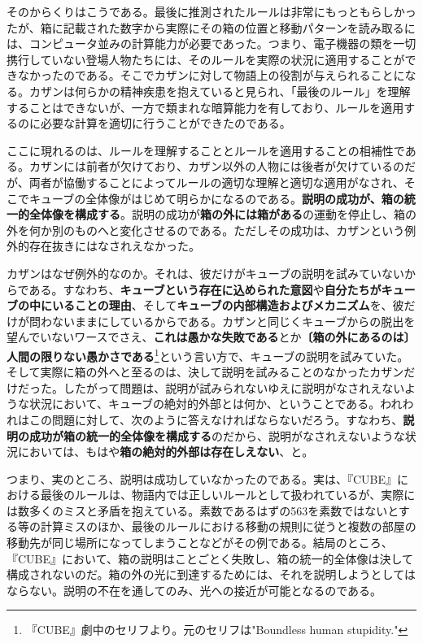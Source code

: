 \documentclass[b5j,twoside,twocolumn]{utarticle}
\begin{document}
そのからくりはこうである。最後に推測されたルールは非常にもっともらしかったが、箱に記載された数字から実際にその箱の位置と移動パターンを読み取るには、コンピュータ並みの計算能力が必要であった。つまり、電子機器の類を一切携行していない登場人物たちには、そのルールを実際の状況に適用することができなかったのである。そこでカザンに対して物語上の役割が与えられることになる。カザンは何らかの精神疾患を抱えていると見られ、「最後のルール」を理解することはできないが、一方で類まれな暗算能力を有しており、ルールを適用するのに必要な計算を適切に行うことができたのである。

ここに現れるのは、ルールを理解することとルールを適用することの相補性である。カザンには前者が欠けており、カザン以外の人物には後者が欠けているのだが、両者が協働することによってルールの適切な理解と適切な適用がなされ、そこでキューブの全体像がはじめて明らかになるのである。\textbf{説明の成功が、箱の統一的全体像を構成する}。説明の成功が\textbf{箱の外には箱がある}の運動を停止し、箱の外を何か別のものへと変化させるのである。ただしその成功は、カザンという例外的存在抜きにはなされえなかった。

カザンはなぜ例外的なのか。それは、彼だけがキューブの説明を試みていないからである。すなわち、\textbf{キューブという存在に込められた意図}や\textbf{自分たちがキューブの中にいることの理由}、そして\textbf{キューブの内部構造およびメカニズム}を、彼だけが問わないままにしているからである。カザンと同じくキューブからの脱出を望んでいないワースでさえ、\textbf{これは愚かな失敗である}とか\textbf{〔箱の外にあるのは〕人間の限りない愚かさである}\footnote{『CUBE』劇中のセリフより。元のセリフは"Boundless human stupidity."}という言い方で、キューブの説明を試みていた。そして実際に箱の外へと至るのは、決して説明を試みることのなかったカザンだけだった。したがって問題は、説明が試みられないゆえに説明がなされえないような状況において、キューブの絶対的外部とは何か、ということである。われわれはこの問題に対して、次のように答えなければならないだろう。すなわち、\textbf{説明の成功が箱の統一的全体像を構成する}のだから、説明がなされえないような状況においては、もはや\textbf{箱の絶対的外部は存在しえない}、と。


つまり、実のところ、説明は成功していなかったのである。実は、『CUBE』における最後のルールは、物語内では正しいルールとして扱われているが、実際には数多くのミスと矛盾を抱えている。素数であるはずの563を素数ではないとする等の計算ミスのほか、最後のルールにおける移動の規則に従うと複数の部屋の移動先が同じ場所になってしまうことなどがその例である。結局のところ、『CUBE』において、箱の説明はことごとく失敗し、箱の統一的全体像は決して構成されないのだ。箱の外の光に到達するためには、それを説明しようとしてはならない。説明の不在を通してのみ、光への接近が可能となるのである。
\end{document}
